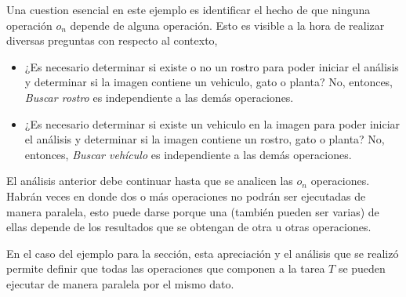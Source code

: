 Una cuestion esencial en este ejemplo es identificar el hecho de que ninguna
operación $o_{n}$ depende de alguna operación.
Esto es visible a la hora de realizar diversas preguntas con
respecto al contexto, 
\begin{itemize}
    \item ¿Es necesario determinar si existe o no un rostro para poder iniciar
      el análisis y determinar si la imagen contiene un vehiculo, gato o
      planta? No, entonces, {\it Buscar rostro} es independiente a las demás
      operaciones.
    \item ¿Es necesario determinar si existe un vehiculo en la imagen para
      poder iniciar el análisis y determinar si la imagen contiene un rostro,
      gato o planta? No, entonces, {\it Buscar vehículo} es independiente a las
      demás operaciones.
\end{itemize}

El análisis anterior debe continuar hasta que se analicen las $o_{n}$
operaciones. Habrán veces en donde dos o más operaciones no podrán ser ejecutadas de
manera paralela, esto puede darse porque una (también pueden ser varias) de ellas 
depende de los resultados que se obtengan de otra u otras operaciones.

En el caso del ejemplo para la sección, esta apreciación y el análisis que se
realizó permite definir que todas las operaciones que componen a la tarea $T$
se pueden ejecutar de manera paralela por el mismo dato.
